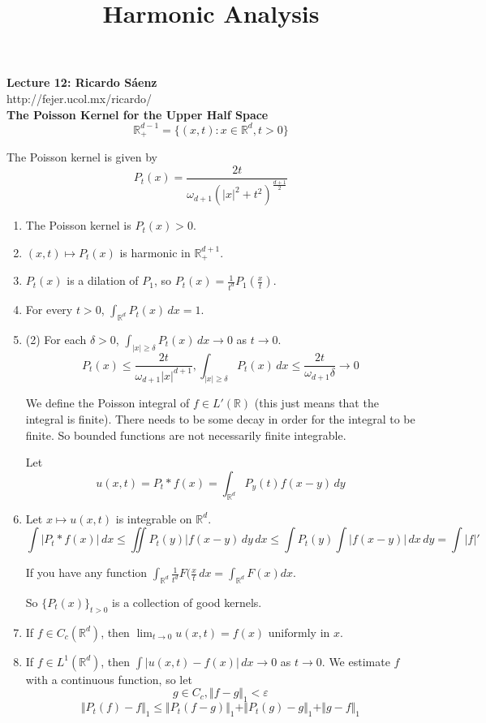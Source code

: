 \documentclass[12pt]{article}
\title{Harmonic Analysis}
\begin{document}
\noindent \textbf{Lecture 12: Ricardo S\'aenz} \\
\noindent http://fejer.ucol.mx/ricardo/ \\

\noindent \textbf{The Poisson Kernel for the Upper Half Space} 
$$\mathbb{R}^{d-1}_+ = \{(x,t) : x \in \mathbb{R}^d, t>0\}$$

\noindent The Poisson kernel is given by
$$ P_t(x) = \frac{2t}{\omega_{d+1}(\vert x \vert^2 + t^2)^{\frac{d+1}{2}} }$$
\begin{enumerate}[itemsep=0pt, parsep=0pt, topsep=0pt, partopsep=0pt]
\item The Poisson kernel is $P_t(x) > 0$.
\item $(x,t) \mapsto P_t(x)$ is harmonic in $\mathbb{R}^{d+1}_+$. 
\item $P_t(x)$ is a dilation of $P_1$, so $P_t(x) = \frac{1}{t^d} P_1 (\frac{x}{t})$.
\item For every $t>0$, $\int_{\mathbb{R}^d} P_t(x) \, dx = 1$.
\item (2) For each $\delta> 0$, $\int_{\vert x \vert \geq \delta} P_t(x) \,dx \rightarrow 0$ as $t \rightarrow 0$. 
$$P_t(x) \leq \frac{2t}{\omega_{d+1}\vert x \vert^{d+1}}, \int_{\vert x \vert \geq \delta} P_t(x) \,dx \leq \frac{2t}{\omega_{d+1} \delta} \rightarrow 0$$

\noindent We define the Poisson integral of $f \in L'(\mathbb{R})$ (this just means that the integral is finite). There needs to be some decay in order for the integral to be finite. So bounded functions are not necessarily finite integrable.

\noindent Let $$u(x,t) = P_t * f(x) = \int_{\mathbb{R}^d} P_y(t) f(x-y) \, dy$$

\item Let $x \mapsto u(x,t)$ is integrable on $\mathbb{R}^d$. 
$$ \int \vert P_t * f(x) \vert \, dx \leq \iint P_t(y) \vert f(x-y) \,dy \,dx \leq  \int P_t(y) \int \vert f(x-y)\vert \,dx \,dy = \int \vert f \vert'$$


If you have any function $\int_{\mathbb{R}^d} \frac{1}{t^d} F(\frac{x}{t} \, dx = \int_{\mathbb{R}^d} F(x) dx$. 

\noindent So $\{P_t(x)\}_{t>0}$ is a collection of good kernels.
\item If $f \in C_c(\mathbb{R}^d)$, then $\lim_{t \rightarrow 0} u (x,t) = f(x)$ uniformly in $x$. 

\item  If $f \in L^1(\mathbb{R}^d)$, then $\int \vert u(x,t) - f(x) \vert \, dx \rightarrow 0$ as $t \rightarrow 0$. We estimate $f$ with a continuous function, so let
$$g \in C_c, \Vert f-g \Vert_1 < \varepsilon$$
$$ \Vert P_t(f) - f \Vert_1 \leq \Vert P_t(f-g)\Vert_1 + \Vert P_t(g) -g \Vert_1 + \Vert g-f \Vert_1$$


\end{enumerate}
\end{document}
